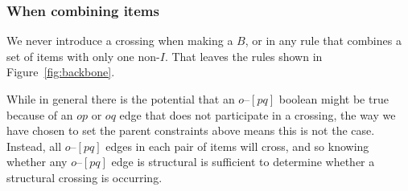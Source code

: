 \subsubsection{When combining items}
We never introduce a crossing when making a $B$, or in any rule that combines a set of items with only one non-$I$.
That leaves the rules shown in Figure~\ref{fig:backbone}.

While in general there is the potential that an $o$--$[pq]$ boolean might be true because of an $op$ or $oq$ edge that does not participate in a crossing, the way we have chosen to set the parent constraints above means this is not the case.
Instead, all $o$--$[pq]$ edges in each pair of items will cross, and so knowing whether any $o$--$[pq]$ edge is structural is sufficient to determine whether a structural crossing is occurring.

